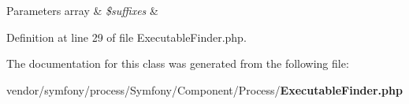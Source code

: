 \begin{DoxyParams}[1]{Parameters}
array & {\em \$suffixes} & \\
\hline
\end{DoxyParams}


Definition at line 29 of file Executable\+Finder.\+php.



The documentation for this class was generated from the following file\+:\begin{DoxyCompactItemize}
\item 
vendor/symfony/process/\+Symfony/\+Component/\+Process/{\bf Executable\+Finder.\+php}\end{DoxyCompactItemize}
